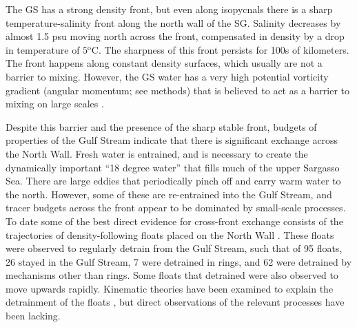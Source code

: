 \documentclass{natureJMK}
\begin{document}
The GS has a strong density front, but even along isopycnals there is a  sharp temperature-salinity front along the north wall of the SG.  Salinity decreases by almost 1.5 psu moving north across the front, compensated in density by a drop in temperature of $5\mathrm{^oC}$.   The sharpness of this front persists for 100s of kilometers.  The front happens along constant density surfaces, which usually are not a barrier to mixing. However, the GS water has a very high potential vorticity gradient (angular momentum; see methods) that is believed to act as a barrier to mixing on large scales \cite{marshalletal06,naveiraetal11}.  

Despite this  barrier and the presence of the sharp stable front, budgets of properties of the Gulf Stream indicate that there is significant exchange across the North Wall\cite{joyceetal13}.  Fresh water is entrained, and is necessary to create the dynamically important ``18 degree water'' that fills much of the upper Sargasso Sea. There are large eddies that periodically pinch off and carry warm water to the north. However, some of these are re-entrained into the Gulf Stream, and tracer budgets across the front appear to be dominated by small-scale processes\cite{boweretal85}. To date some of the best direct evidence for cross-front exchange consists of the trajectories of density-following floats placed on the North Wall \cite{bowerrossby89,bowerlozier94}.  These floats were observed to regularly detrain from the Gulf Stream, such that of 95 floats, 26 stayed in the Gulf Stream, 7 were detrained in rings, and 62 were detrained by mechanisms other than rings\cite{bowerlozier94}.  Some floats that detrained were also observed to move upwards rapidly.  Kinematic theories have been examined to explain the detrainment of the floats \cite{flierletal87,stern85}, but direct observations of the relevant processes have been lacking.  

\end{document}
